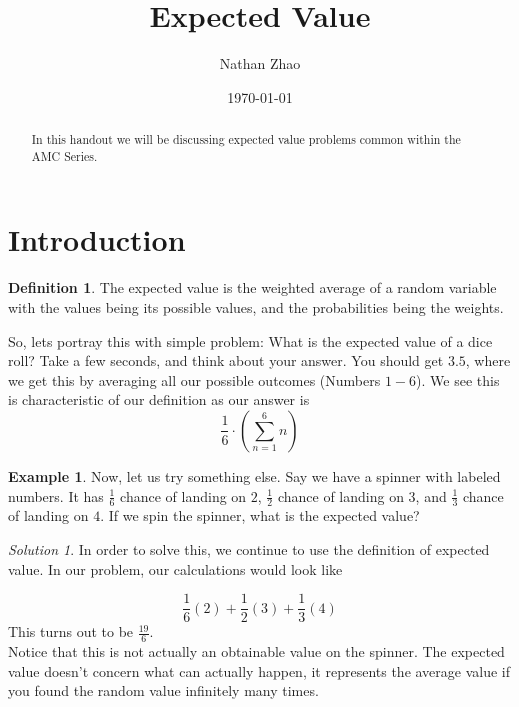 \documentclass[letterpaper]{article}
\title{Expected Value}
\author{Nathan Zhao}
\date{\today}
\theoremstyle{definition}
\newtheorem{example}[thm]{Example}
\newtheorem{definition}[thm]{Definition}
\theoremstyle{remark}
\newtheorem*{solution}{Solution}
\theoremstyle{definition}
\begin{document}
\maketitle

\begin{abstract}
In this handout we will be discussing expected value problems common within the AMC Series.
\end{abstract}

\section{Introduction}
\begin{mdframed}
    \begin{definition}
        The expected value is the weighted average of a random variable with the values being its possible values, and the probabilities being the weights.
    \end{definition}
\end{mdframed}

So, lets portray this with simple problem: What is the expected value of a dice roll? Take a few seconds, and think about your answer. You should get $3.5$, where we get this by averaging all our possible outcomes (Numbers $1-6$). We see this is characteristic of our definition as our answer is $$\frac{1}{6} \cdot \left(\sum_{n=1}^{6} n \right)$$

\begin{example}
Now, let us try something else. Say we have a spinner with labeled numbers. It has $\frac{1}{6}$ chance of landing on $2$, $\frac{1}{2}$ chance of landing on $3$, and $\frac{1}{3}$ chance of landing on $4$. If we spin the spinner, what is the expected value?
\end{example}

\begin{solution}
In order to solve this, we continue to use the definition of expected value. In our problem, our calculations would look like

$$\frac{1}{6}(2) + \frac{1}{2}(3) + \frac{1}{3}(4)$$
This turns out to be $\boxed{\frac{19}{6}}$.\\
Notice that this is not actually an obtainable value on the spinner. The expected value doesn't concern what can actually happen, it represents the average value if you found the random value infinitely many times.\\
\end{solution}

\noindent
\end{document}
